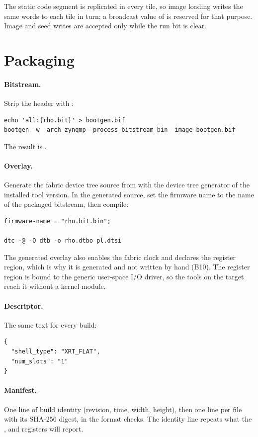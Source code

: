 The static code segment is replicated in every tile, so image loading
writes the same words to each tile in turn; a broadcast value of
 is reserved for that purpose. Image and seed writes are
accepted only while the run bit is clear.

\section{Packaging}\label{sec:package}

\paragraph{Bitstream.} Strip the header with :
\begin{lstlisting}
echo 'all:{rho.bit}' > bootgen.bif
bootgen -w -arch zynqmp -process_bitstream bin -image bootgen.bif
\end{lstlisting}
The result is .

\paragraph{Overlay.} Generate the fabric device tree source from
 with the device tree generator of the installed tool
version. In the generated source, set the firmware name to the name of the
packaged bitstream, then compile:
\begin{lstlisting}
firmware-name = "rho.bit.bin";

dtc -@ -O dtb -o rho.dtbo pl.dtsi
\end{lstlisting}
The generated overlay also enables the fabric clock and declares the
register region, which is why it is generated and not written by hand (B10).
The register region is bound to the generic user-space I/O driver, so the
tools on the target reach it without a kernel module.

\paragraph{Descriptor.} The same text for every build:
\begin{lstlisting}
{
  "shell_type": "XRT_FLAT",
  "num_slots": "1"
}
\end{lstlisting}

\paragraph{Manifest.} One line of build identity (revision, time, width,
height), then one line per file with its SHA-256 digest, in the format  checks. The identity line
repeats what the ,  and  registers
will report.

